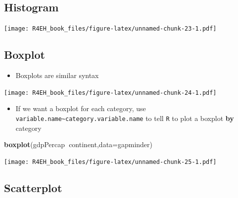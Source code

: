 \documentclass[]{book}
\newenvironment{Shaded}{\begin{snugshade}}{\end{snugshade}}
\newcommand{\KeywordTok}[1]{\textcolor[rgb]{0.13,0.29,0.53}{\textbf{#1}}}
\newcommand{\DataTypeTok}[1]{\textcolor[rgb]{0.13,0.29,0.53}{#1}}
\newcommand{\StringTok}[1]{\textcolor[rgb]{0.31,0.60,0.02}{#1}}
\newcommand{\OperatorTok}[1]{\textcolor[rgb]{0.81,0.36,0.00}{\textbf{#1}}}
\newcommand{\NormalTok}[1]{#1}
\providecommand{\tightlist}{%
  \setlength{\itemsep}{0pt}\setlength{\parskip}{0pt}}
\theoremstyle{definition}
\theoremstyle{definition}
\theoremstyle{definition}
\theoremstyle{remark}
\begin{document}
\subsection{Histogram}\label{histogram}

\begin{Shaded}
\end{Shaded}

\texttt{[image: R4EH\_book\_files/figure-latex/unnamed-chunk-23-1.pdf]}

\subsection{Boxplot}\label{boxplot}

\begin{itemize}
\tightlist
\item
  Boxplots are similar syntax
\end{itemize}

\begin{Shaded}
\end{Shaded}

\texttt{[image: R4EH\_book\_files/figure-latex/unnamed-chunk-24-1.pdf]}

\begin{itemize}
\tightlist
\item
  If we want a boxplot for each category, use
  \texttt{variable.name\textasciitilde{}category.variable.name} to tell
  \texttt{R} to plot a boxplot \textbf{by} category
\end{itemize}

\begin{Shaded}
\begin{Highlighting}[]
\KeywordTok{boxplot}\NormalTok{(gdpPercap}\OperatorTok{~}\NormalTok{continent,}\DataTypeTok{data=}\NormalTok{gapminder)}
\end{Highlighting}
\end{Shaded}

\texttt{[image: R4EH\_book\_files/figure-latex/unnamed-chunk-25-1.pdf]}

\subsection{Scatterplot}\label{scatterplot}
\end{document}
